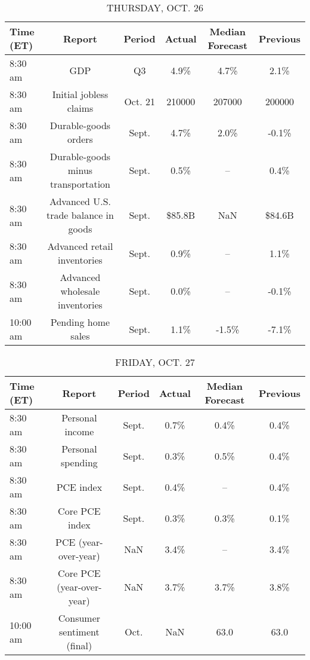\documentclass{article}%
\begin{document}
\begin{table}[htbp]%
\caption{THURSDAY, OCT. 26}%
\centering%
\begin{adjustbox}{width=1\textwidth}%
\begin{tabular}{lccccc}
\toprule
Time (ET) &                               Report &  Period & Actual & Median Forecast & Previous \\
\midrule
  8:30 am &                                  GDP &      Q3 &   4.9\% &            4.7\% &     2.1\% \\
  8:30 am &               Initial jobless claims & Oct. 21 & 210000 &          207000 &   200000 \\
  8:30 am &                 Durable-goods orders &   Sept. &   4.7\% &            2.0\% &    -0.1\% \\
  8:30 am &   Durable-goods minus transportation &   Sept. &   0.5\% &              -- &     0.4\% \\
  8:30 am & Advanced U.S. trade balance in goods &   Sept. & \$85.8B &             NaN &   \$84.6B \\
  8:30 am &          Advanced retail inventories &   Sept. &   0.9\% &              -- &     1.1\% \\
  8:30 am &       Advanced wholesale inventories &   Sept. &   0.0\% &              -- &    -0.1\% \\
 10:00 am &                   Pending home sales &   Sept. &   1.1\% &           -1.5\% &    -7.1\% \\
\bottomrule
\end{tabular}
%
\end{adjustbox}%
\end{table}

%


\begin{table}[htbp]%
\caption{FRIDAY, OCT. 27}%
\centering%
\begin{adjustbox}{width=1\textwidth}%
\begin{tabular}{lccccc}
\toprule
Time (ET) &                     Report & Period & Actual & Median Forecast & Previous \\
\midrule
  8:30 am &            Personal income &  Sept. &   0.7\% &            0.4\% &     0.4\% \\
  8:30 am &          Personal spending &  Sept. &   0.3\% &            0.5\% &     0.4\% \\
  8:30 am &                  PCE index &  Sept. &   0.4\% &              -- &     0.4\% \\
  8:30 am &             Core PCE index &  Sept. &   0.3\% &            0.3\% &     0.1\% \\
  8:30 am &       PCE (year-over-year) &    NaN &   3.4\% &              -- &     3.4\% \\
  8:30 am &  Core PCE (year-over-year) &    NaN &   3.7\% &            3.7\% &     3.8\% \\
 10:00 am & Consumer sentiment (final) &   Oct. &    NaN &            63.0 &     63.0 \\
\bottomrule
\end{tabular}
%
\end{adjustbox}%
\end{table}
\end{document}
